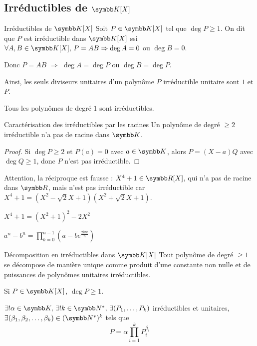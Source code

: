 \subsection{Irréductibles de \texorpdfstring{$\K[X]$}{K[X]}}

\begin{definition}{Irréductibles de $\K[X]$}{}
    Soit $P \in \K[X]$ tel que $\deg P \geqslant 1$. On dit que $P$ est irréductible 
    dans $\K[X]$ ssi $\forall A, B \in \K[X], \, P = AB \Rightarrow \deg A = 0$ ou $\deg B = 0$.

    Donc $P = AB$ $\Rightarrow$ $\deg A = \deg P$ ou $\deg B = \deg P$.

    Ainsi, les seuls diviseurs unitaires d'un polynôme $P$ irréductible unitaire sont 
    $1$ et $P$.
\end{definition}

\begin{exemple}
    Tous les polynômes de degré $1$ sont irréductibles.
\end{exemple}

\begin{proposition}{Caractérisation des irréductibles par les racines}{}
    Un polynôme de degré $\geqslant 2$ irréductible n'a pas de racine dans $\K$.
\end{proposition}

\begin{proof}
    Si $\deg P \geqslant 2$ et $P(a) = 0$ avec $a \in \K$, alors
    $P = (X - a) Q$ avec $\deg Q \geqslant 1$, donc $P$ n'est pas irréductible.
\end{proof}

\begin{remarque}
    Attention, la réciproque est fausse :
    $X^4 + 1 \in \R[X]$, qui n'a pas de racine dans $\R$, mais n'est pas irréductible car 
    $X^4 + 1 = (X^2 - \sqrt 2 X + 1)(X^2 + \sqrt 2 X + 1)$.
\end{remarque}


\avspace $X^4 + 1 = (X^2 + 1)^2 - 2X^2$

$\displaystyle a^n - b^n = \prod_{k = 0}^{n - 1} (a - b e^{\frac{2i\pi k} n})$

\begin{theoreme}{Décomposition en irréductibles dans $\K[X]$}{}
    Tout polynôme de degré $\geqslant 1$ se décompose de manière unique comme produit d'une constante 
    non nulle et de puissances de polynômes unitaires irréductibles. 

    Si $ P \in \K[X]$, $\deg P \geqslant 1$. 

    $\exists ! \alpha \in \K, \, \exists ! k \in \N^*, \, \exists (P_1, \ldots, P_k)$ irréductibles et unitaires, 
    $\exists (\beta_1, \beta_2, \ldots, \beta_k) \in (\N^*)^k$ tels que
    \[P = \alpha \prod_{i = 1}^k P_i^{\beta_i}\]
\end{theoreme}

